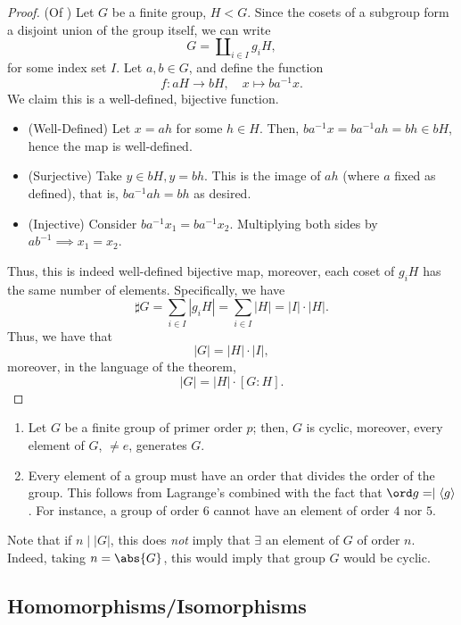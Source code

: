 \documentclass[12pt,oneside]{article}
\begin{document}
\begin{proof}(Of )
  Let $G$ be a finite group, $H < G$. Since the cosets of a subgroup form a disjoint union of the group itself, we can write \[
  G = \amalg_{i\in I} g_i H,  
  \]
  for some index set $I$. Let $a, b \in G$, and define the function \[f: aH \to bH, \quad x \mapsto ba^{-1}x.\]
  We claim this is a well-defined, bijective function. \begin{itemize}
    \item (Well-Defined) Let $x = ah$ for some $h \in H$. Then, $ba^{-1}x = ba^{-1}ah= bh \in bH$, hence the map is well-defined.
    \item (Surjective) Take $y \in bH, y = bh$. This is the image of $ah$ (where $a$ fixed as defined), that is, $ba^{-1}ah = bh$ as desired.
    \item (Injective) Consider $ba^{-1} x_1 = ba^{-1} x_2$. Multiplying both sides by $ab^{-1} \implies x_1 = x_2$.
  \end{itemize}
  Thus, this is indeed well-defined bijective map, moreover, each coset of $g_i H$ has the same number of elements. Specifically, we have \[
  \sharp G = \sum_{i\in I} |g_i H|   = \sum_{i\in I} |H| = |I| \cdot |H|.
  \] Thus, we have that \[|G| = | H | \cdot | I |,\] moreover, in the language of the theorem,
  \[
  |G| = |H| \cdot [G: H].
  \]
\end{proof}

\begin{remark}
  \begin{enumerate}
    \item Let $G$ be a finite group of primer order $p$; then, $G$ is cyclic, moreover, every element of $G$, $\neq e$, generates $G$.
    \item Every element of a group must have an order that divides the order of the group. This follows from Lagrange's combined with the fact that $\ord g = \mid \langle g \rangle$. For instance, a group of order $6$ cannot have an element of order $4$ nor $5$.
  \end{enumerate}
\end{remark}

\begin{remark}
  Note that if $n \mid |G|$, this does \emph{not} imply that $\exists$ an element of $G$ of order $n$. Indeed, taking $n = \abs{G}$, this would imply that group $G$ would be cyclic.
\end{remark}
  
  \subsection{Homomorphisms/Isomorphisms}
\end{document}
